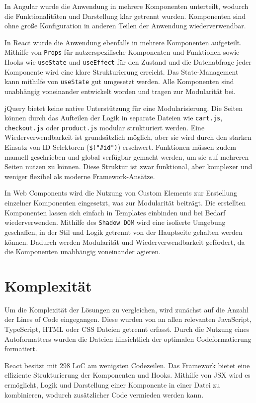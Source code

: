 \documentclass[oneside]{ausarbeitung}
\begin{document}
In Angular wurde die Anwendung in mehrere Komponenten unterteilt, wodurch die Funktionalitäten und Darstellung klar getrennt wurden. Komponenten sind ohne große Konfiguration in anderen Teilen der Anwendung wiederverwendbar.  

In React wurde die Anwendung ebenfalls in mehrere Komponenten aufgeteilt. Mithilfe von \texttt{Props} für nutzerspezifische Komponenten und Funktionen sowie Hooks wie \texttt{useState} und \texttt{useEffect} für den Zustand und die Datenabfrage jeder Komponente wird eine klare Strukturierung erreicht. Das State-Management kann mithilfe von \texttt{useState} gut umgesetzt werden. Alle Komponenten sind unabhängig voneinander entwickelt worden und tragen zur Modularität bei.  

jQuery bietet keine native Unterstützung für eine Modularisierung. Die Seiten können durch das Aufteilen der Logik in separate Dateien wie \texttt{cart.js}, \texttt{checkout.js} oder \texttt{product.js} modular strukturiert werden. Eine Wiederverwendbarkeit ist grundsätzlich möglich, aber sie wird durch den starken Einsatz von ID-Selektoren (\texttt{\$("\#id")}) erschwert. Funktionen müssen zudem manuell geschrieben und global verfügbar gemacht werden, um sie auf mehreren Seiten nutzen zu können. Diese Struktur ist zwar funktional, aber komplexer und weniger flexibel als moderne Framework-Ansätze.

In Web Components wird die Nutzung von Custom Elements zur Erstellung einzelner Komponenten eingesetzt, was zur Modularität beiträgt. Die erstellten Komponenten lassen sich einfach in Templates einbinden und bei Bedarf wiederverwenden. Mithilfe des \texttt{Shadow DOM} wird eine isolierte Umgebung geschaffen, in der Stil und Logik getrennt von der Hauptseite gehalten werden können. Dadurch werden Modularität und Wiederverwendbarkeit gefördert, da die Komponenten unabhängig voneinander agieren.

\section{Komplexität}

Um die Komplexität der Lösungen zu vergleichen, wird zunächst auf die Anzahl der Lines of Code eingegangen. Diese wurden von an allen relevanten JavaScript, TypeScript, HTML oder CSS Dateien getrennt erfasst. Durch die Nutzung eines Autoformatters wurden die Dateien hinsichtlich der optimalen Codeformatierung formatiert. 

React besitzt mit 298 LoC am wenigsten Codezeilen. Das Framework bietet eine effiziente Strukturierung der Komponenten und Hooks. Mithilfe von JSX wird es ermöglicht, Logik und Darstellung einer Komponente in einer Datei zu kombinieren, wodurch zusätzlicher Code vermieden werden kann. 
\end{document}
